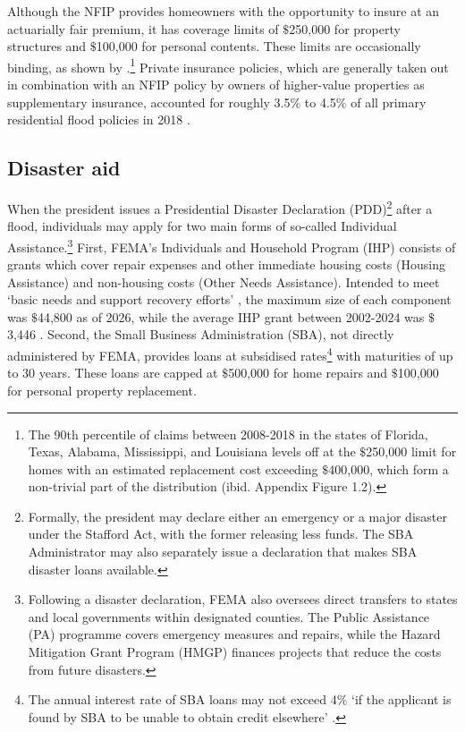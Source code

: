 \documentclass[12pt]{article}
\begin{document}
Although the NFIP provides homeowners with the opportunity to insure at an actuarially fair premium, it has coverage limits of $\$$250,000 for property structures and $\$$100,000 for personal contents. These limits are occasionally binding, as shown by \cite{sastry2026bears}.\footnote{The 90th percentile of claims between 2008-2018 in the states of Florida, Texas, Alabama, Mississippi, and Louisiana  levels off at the $\$$250,000 limit for homes with an estimated replacement cost exceeding $\$$400,000, which form a non-trivial part of the distribution (ibid. Appendix Figure 1.2).} Private insurance policies, which are generally taken out in combination with an NFIP policy by owners of higher-value properties as supplementary insurance, accounted for roughly 3.5$\%$ to 4.5$\%$ of all primary residential flood policies in 2018 \citep{kousky2018emerging}.

\subsection{Disaster aid}
When the president issues a Presidential Disaster Declaration (PDD)\footnote{Formally, the president may declare either an emergency or a major disaster under the Stafford Act, with the former releasing less funds. The SBA Administrator may also separately issue a declaration that makes SBA disaster loans available.} after a flood, individuals may apply for two main forms of so-called Individual Assistance.\footnote{Following a disaster declaration, FEMA also oversees direct transfers to states and local governments within designated counties. The Public Assistance (PA) programme covers emergency measures and repairs, while the Hazard Mitigation Grant Program (HMGP) finances projects that reduce the costs from future disasters.} First, FEMA's Individuals and Household Program (IHP) consists of grants which cover repair expenses and other immediate housing costs (Housing Assistance) and non-housing costs (Other Needs Assistance). Intended to meet `basic needs and support recovery efforts' \citep{crs2024disaster}, the maximum size of each component was $\$$44,800 as of 2026, while the average IHP grant between 2002-2024 was $\$$3,446 \citep{crs2025ihpfaq}. Second, the Small Business Administration (SBA), not directly administered by FEMA, provides loans at subsidised rates\footnote{The annual interest rate of SBA loans may not exceed 4$\%$ `if the applicant is found 
by SBA to be unable to obtain credit elsewhere' \citep[p.~2]{crs2024disaster}.} with maturities of up to 30 years. These loans are capped at $\$$500,000 for home repairs and $\$$100,000 for personal property replacement. 
\end{document}
